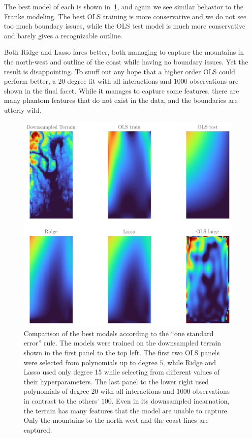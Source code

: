 The best model of each is shown in~\ref{fig:geocomp}, and again we see
similar behavior to the Franke modeling. The best OLS training is more
conservative and we do not see too much boundary issues, while the OLS test
model is much more conservative and barely gives a recognizable outline. 

Both Ridge and Lasso fares better, both managing to capture the mountains in the
north-west and outline of the coast while having no boundary issues. Yet the
result is disappointing. To snuff out any hope that a higher order OLS could
perform better, a \(20\) degree fit with all interactions and \(1000\)
observations are shown in the final facet. While it manages to capture some
features, there are many phantom features that do not exist in the data, and the
boundaries are utterly wild.

\begin{figure}[b]
  \includegraphics[]{figures/geo_comp.png}
  \caption{\label{fig:geocomp} Comparison of the best models according
    to the ``one standard error'' rule. The models were trained on the
    downsampled terrain shown in the first panel to the top left. The first two
    OLS panels were selected from polynomials up to degree \(5\), while Ridge
    and Lasso used only degree 15 while selecting from different values of their
    hyperparameters. The last panel to the lower right used polynomials of
    degree 20 with all interactions and \(1000\) observations in contrast to the
  others' \(100\). Even in its downsampled incarnation, the terrain has many
  features that the model are unable to capture. Only the mountains to the north
west and the coast lines are captured.}
\end{figure}

